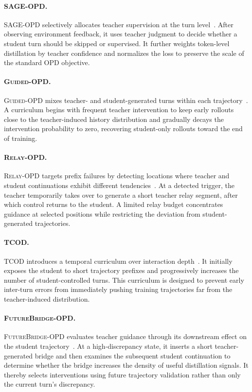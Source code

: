 \paragraph{\textsc{SAGE-OPD}.}
\textsc{SAGE-OPD} selectively allocates teacher supervision at the turn level~\citep{abs-2606-19659}.  After observing environment feedback, it uses teacher judgment to decide whether a student turn should be skipped or supervised. 
It further weights token-level distillation by teacher confidence and normalizes the loss to preserve the scale of the standard OPD objective.

\paragraph{\textsc{Guided-OPD}.}
\textsc{Guided-OPD} mixes teacher- and student-generated turns within each trajectory~\citep{abs-2606-15912}. 
A curriculum begins with frequent teacher intervention to keep early rollouts close to the teacher-induced history distribution and gradually decays the intervention probability to zero, recovering student-only rollouts toward the end of training.

\paragraph{\textsc{Relay-OPD}.}
\textsc{Relay-OPD} targets prefix failures by detecting locations where teacher and student continuations exhibit different tendencies~\citep{abs-2607-26057}. 
At a detected trigger, the teacher temporarily takes over to generate a short teacher relay segment, after which control returns to the student. 
A limited relay budget concentrates guidance at selected positions while restricting the deviation from student-generated trajectories.

\paragraph{\textsc{TCOD}.}
\textsc{TCOD} introduces a temporal curriculum over interaction depth~\citep{abs-2604-24005}. 
It initially exposes the student to short trajectory prefixes and progressively increases the number of student-controlled turns. 
This curriculum is designed to prevent early inter-turn errors from immediately pushing training trajectories far from the teacher-induced distribution.

\paragraph{\textsc{FutureBridge-OPD}.}
\textsc{FutureBridge-OPD} evaluates teacher guidance through its downstream effect on the student trajectory~\citep{abs-2608-01953}. 
At a high-discrepancy state, it inserts a short teacher-generated bridge and then examines the subsequent student continuation to determine whether the bridge increases the density of useful distillation signals.
It thereby selects interventions using future trajectory validation rather than only the current turn's discrepancy.

